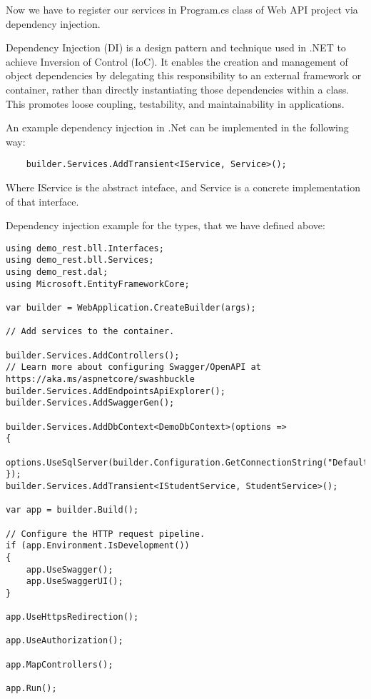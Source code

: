 Now we have to register our services in Program.cs class of Web API project via dependency injection.

Dependency Injection (DI) is a design pattern and technique used in .NET to achieve Inversion of Control (IoC). 
It enables the creation and management of object dependencies by delegating this responsibility to an external framework or container, 
rather than directly instantiating those dependencies within a class. This promotes loose coupling, testability, and maintainability 
in applications.

An example dependency injection in .Net can be implemented in the following way:

\begin{lstlisting}
    builder.Services.AddTransient<IService, Service>();
\end{lstlisting}

Where IService is the abstract inteface, and Service is a concrete implementation of that interface.


Dependency injection example for the types, that we have defined above:

\begin{lstlisting}
using demo_rest.bll.Interfaces;
using demo_rest.bll.Services;
using demo_rest.dal;
using Microsoft.EntityFrameworkCore;

var builder = WebApplication.CreateBuilder(args);

// Add services to the container.

builder.Services.AddControllers();
// Learn more about configuring Swagger/OpenAPI at https://aka.ms/aspnetcore/swashbuckle
builder.Services.AddEndpointsApiExplorer();
builder.Services.AddSwaggerGen();

builder.Services.AddDbContext<DemoDbContext>(options =>
{
    options.UseSqlServer(builder.Configuration.GetConnectionString("DefaultConnection"));
});
builder.Services.AddTransient<IStudentService, StudentService>();

var app = builder.Build();

// Configure the HTTP request pipeline.
if (app.Environment.IsDevelopment())
{
    app.UseSwagger();
    app.UseSwaggerUI();
}

app.UseHttpsRedirection();

app.UseAuthorization();

app.MapControllers();

app.Run();

\end{lstlisting}

